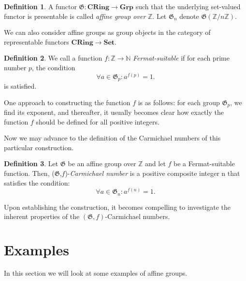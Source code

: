 \documentclass{article}
\theoremstyle{definition}
\theoremstyle{definition}
\newtheorem{definition}{Definition}
\begin{document}
\begin{definition}
    A functor $\mathfrak{G}:\mathbf{CRing}\xrightarrow{}\mathbf{Grp}$ such that the underlying set-valued functor is presentable 
    is called \textit{affine group over} $\mathbb{Z}$.
    Let $\mathfrak{G}_n$ denote $\mathfrak{G}(\mathbb{Z}/n\mathbb{Z})$.
\end{definition}

We can also consider affine groups as group objects in the category of representable functors 
\newline $\mathbf{CRing}\xrightarrow{}\mathbf{Set}$.



\begin{definition}
    We call a function $f:\mathbb{Z} \xrightarrow{} \mathbb{N}$ \textit{Fermat-suitable} if for each prime number $p$, the condition
    $$\forall a \in \mathfrak{G}_p : a^{f(p)} = 1.$$
    is satisfied.
\end{definition}
One approach to constructing the function $f$ is as follows: for each group $\mathfrak{G}_p$, we find its exponent, and thereafter,
 it usually becomes clear how exactly the function $f$ should be defined for all positive integers.

Now we may advance to the definition of the Carmichael numbers of this particular construction.

\begin{definition} Let $\mathfrak{G}$ be an affine 
group over $\mathbb{Z}$ and let $f$ be a Fermat-suitable function. Then, ($\mathfrak{G}$,$f$)-\textit{Carmichael number}
 is a positive composite integer n that satisfies the condition: $$\forall a \in \mathfrak{G}_n : a^{f(n)} = 1.$$ 
\end{definition}

Upon establishing the construction, it becomes compelling to investigate the inherent properties of the 
$(\mathfrak{G}, f)$-Carmichael numbers.

\newpage
\section{Examples}
In this section we will look at some examples of affine groups.
\end{document}
